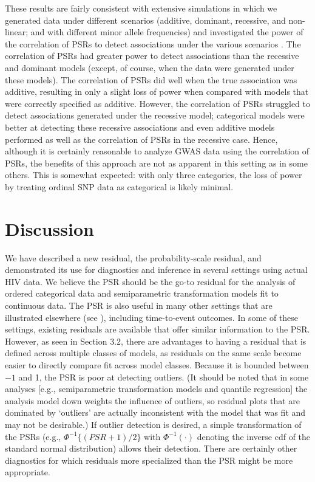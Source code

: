 \documentclass[12pt, usenatbib]{article}
\begin{document}
These results are fairly consistent with extensive simulations in which we generated data under different scenarios (additive, dominant, recessive, and non-linear; and with different minor allele frequencies) and investigated the power of the correlation of PSRs to detect associations under the various scenarios \citep{wanga2014}.  The correlation of PSRs had greater power to detect associations than the recessive and dominant models (except, of course, when the data were generated under these models).  The correlation of PSRs did well when the true association was additive, resulting in only a slight loss of power when compared with models that were correctly specified as additive.  However, the correlation of PSRs struggled to detect associations generated under the recessive model; categorical models were better at detecting these recessive associations and even additive models performed as well as the correlation of PSRs in the recessive case.  Hence, although it is certainly reasonable to analyze GWAS data using the correlation of PSRs, the benefits of this approach are not as apparent in this setting as in some others.  This is somewhat expected: with only three categories, the loss of power by treating ordinal SNP data as categorical is likely minimal.


\section{Discussion}

We have described a new residual, the probability-scale residual, and demonstrated its use for diagnostics and inference in several settings using actual HIV data.  We believe the PSR should be the go-to residual for the analysis of ordered categorical data and semiparametric transformation models fit to continuous data.  The PSR is also useful in many other settings that are illustrated elsewhere (see \cite{shepherd2016psr}), including time-to-event outcomes.  In some of these settings, existing residuals are available that offer similar information to the PSR.  However, as seen in Section 3.2, there are advantages to having a residual that is defined across multiple classes of models, as residuals on the same scale become easier to directly compare fit across model classes.  Because it is bounded between $-1$ and 1, the PSR is poor at detecting outliers.  (It should be noted that in some analyses [e.g., semiparametric transformation models and quantile regression] the analysis model down weights the influence of outliers, so residual plots that are dominated by \lq outliers' are actually inconsistent with the model that was fit and may not be desirable.)  If outlier detection is desired, a simple transformation of the PSRs (e.g., $\Phi^{-1}\{(PSR+1)/2\}$ with $\Phi^{-1}(\cdot)$ denoting the inverse cdf of the standard normal distribution) allows their detection.  There are certainly other diagnostics for which residuals more specialized than the PSR might be more appropriate.
\end{document}

